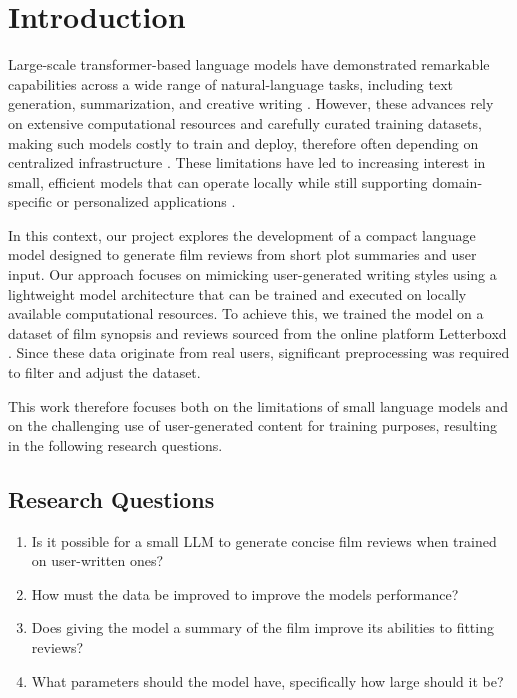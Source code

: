 \section{Introduction} \label{sec:introduction}
Large-scale transformer-based language models have demonstrated remarkable capabilities across a wide range of natural-language tasks, including text generation, summarization, and creative writing \cite{attention}\cite{GPT-3}.
However, these advances rely on extensive computational resources and carefully curated training datasets, making such models costly to train and deploy, therefore often depending on centralized infrastructure \cite{energy}.
These limitations have led to increasing interest in small, efficient models that can operate locally while still supporting domain-specific or personalized applications \cite{smallLMs}.

In this context, our project explores the development of a compact language model designed to generate film reviews from short plot summaries and user input.
Our approach focuses on mimicking user-generated writing styles using a lightweight model architecture that can be trained and executed on locally available computational resources.
To achieve this, we trained the model on a dataset of film synopsis and reviews sourced from the online platform Letterboxd \cite{letterboxd}.
Since these data originate from real users, significant preprocessing was required to filter and adjust the dataset.

This work therefore focuses both on the limitations of small language models and on the challenging use of user-generated content for training purposes, resulting in the following research questions.


\subsection*{Research Questions} \label{subsec:research-questions}
\begin{enumerate}
    \setlength{\topsep}{0pt}
    \setlength{\itemsep}{0pt}
    \setlength{\parskip}{0pt}
    \item Is it possible for a small LLM to generate concise film reviews when trained on user-written ones?
    \item How must the data be improved to improve the models performance?
    \item Does giving the model a summary of the film improve its abilities to fitting reviews?
    \item What parameters should the model have, specifically how large should it be?
\end{enumerate}


